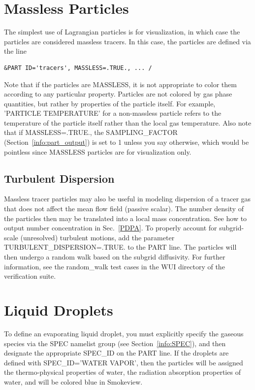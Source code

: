 \documentclass[11pt]{book}
\begin{document}
\section{Massless Particles}
\label{info:MASSLESS}

The simplest use of Lagrangian particles is for visualization, in which case the
particles are considered massless tracers. In this case, the particles are
defined via the line
\begin{lstlisting}
&PART ID='tracers', MASSLESS=.TRUE., ... /
\end{lstlisting}
Note that if the particles are {\ct MASSLESS}, it is not appropriate to color them according to any particular property. Particles are not colored by gas phase quantities, but rather by properties of the particle itself. For example, {\ct 'PARTICLE TEMPERATURE'} for a non-massless particle refers to the temperature of the particle itself rather than the local gas temperature. Also note that if {\ct MASSLESS=.TRUE.}, the {\ct SAMPLING\_FACTOR} (Section~\ref{info:part_output}) is set to 1 unless you say otherwise, which would be pointless
since {\ct MASSLESS} particles are for visualization only.

\subsection*{Turbulent Dispersion}

Massless tracer particles may also be useful in modeling dispersion of a tracer gas that does not affect the mean flow field (passive scalar).  The number density of the particles then may be translated into a local mass concentration.  See how to output number concentration in Sec.~\ref{PDPA}.  To properly account for subgrid-scale (unresolved) turbulent motions, add the parameter {\ct TURBULENT\_DISPERSION=.TRUE.} to the {\ct PART} line.  The particles will then undergo a random walk based on the subgrid diffusivity.  For further information, see the {\ct random\_walk} test cases in the {\ct WUI} directory of the verification suite.


\section{Liquid Droplets}

To define an evaporating liquid droplet, you must explicitly specify the gaseous species via the {\ct SPEC} namelist group (see Section~\ref{info:SPEC}), and then
designate the appropriate {\ct SPEC\_ID} on the {\ct PART} line.
If the droplets are defined with {\ct SPEC\_ID='WATER VAPOR'}, then the particles will be assigned the thermo-physical properties of water,
the radiation absorption properties of water, and will be colored blue in Smokeview.
\end{document}
